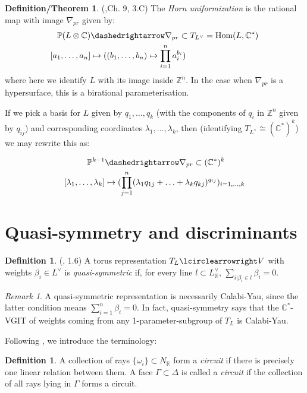\documentclass[a4paper]{article}
\theoremstyle{plain}
\theoremstyle{definition}
\newtheorem{df}[thm]{Definition}
\newtheorem{df/thm}[thm]{Definition/Theorem}
\theoremstyle{remark}
\newtheorem{rem}[thm]{Remark}
\begin{document}
\begin{df/thm}{(\cite{GKZ},Ch. 9, 3.C)}
The \textit{Horn uniformization} is the rational map with image $\nabla_{pr}$ given by:
\begin{align*}
\mathbb{P}(L \otimes \mathbb{C}) & \dashedrightarrow \nabla_{pr} \subset T_{L^{\vee}}=\text{Hom}(L,\mathbb{C}^*) \\
{[a_1,\hdots ,a_n]} & \mapsto ((b_1, \hdots , b_n) \mapsto \prod_{i=1}^n a_i^{b_i} )
\end{align*} 
where here we identify $L$ with its image inside $\mathbb{Z}^n$. In the case when $\nabla_{pr}$ is a hypersurface, this is a birational parameterisation.
\end{df/thm}

If we pick a basis for $L$ given by $q_1, \hdots, q_k$ (with the components of $q_i$ in $\mathbb{Z}^n$ given by $q_{ij}$) and corresponding coordinates $\lambda_1, \hdots, \lambda_k$, then (identifying $T_{L^{\vee}} \cong (\mathbb{C}^*)^k$) we may rewrite this as:

\begin{align}
\mathbb{P}^{k-1} & \dashedrightarrow \nabla_{pr} \subset (\mathbb{C}^*)^k \nonumber \\ 
{[\lambda_1, \hdots, \lambda_k]} & \mapsto ( \prod_{j=1}^n ( \lambda_1 q_{1j}+ \hdots + \lambda_k q_{kj} )^{q_{ij}}  )_{i=1, \hdots, k} \label{Horn}
\end{align}

\section{Quasi-symmetry and discriminants}

\begin{df}{(\cite{SV}, 1.6)}
A torus representation $T_L \lcirclearrowright V$ with weights $\beta_i \in L^{\vee}$ is \textit{quasi-symmetric} if, for every line $l \subset L^{\vee}_{\mathbb{R}}$, $\sum_{i | \beta_i \in l} \beta_i=0$.
\label{QS}
\end{df}

\begin{rem}
A quasi-symmetric representation is necessarily Calabi-Yau, since the latter condition means $\sum_{i=1}^n \beta_i=0$. In fact, quasi-symmetry says that the $\mathbb{C}^*$-VGIT  of weights coming from any 1-parameter-subgroup of $T_L$ is Calabi-Yau.
\end{rem}

Following \cite{GKZ}, we introduce the terminology:
\begin{df}
A collection of rays $\{\omega_i\} \subset N_{\mathbb{R}}$ form a \textit{circuit} if there is precisely one linear relation between them. A face $\Gamma \subset \Delta$ is called a \textit{circuit} if the collection of all rays lying in $\Gamma$ forms a circuit.
\end{df}
\end{document}
